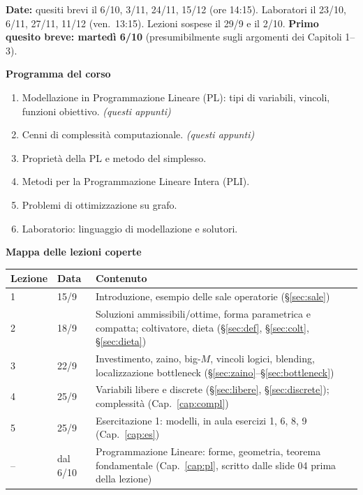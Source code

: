 \textbf{Date:} quesiti brevi il 6/10, 3/11, 24/11, 15/12 (ore 14:15). Laboratori il 23/10, 6/11, 27/11, 11/12 (ven.\ 13:15). Lezioni sospese il 29/9 e il 2/10. \textbf{Primo quesito breve: martedì 6/10} (presumibilmente sugli argomenti dei Capitoli 1--3).

\textbf{Programma del corso}
\begin{enumerate}[nosep]
  \item Modellazione in Programmazione Lineare (PL): tipi di variabili, vincoli, funzioni obiettivo. \hfill \emph{(questi appunti)}
  \item Cenni di complessità computazionale. \hfill \emph{(questi appunti)}
  \item Proprietà della PL e metodo del simplesso.
  \item Metodi per la Programmazione Lineare Intera (PLI).
  \item Problemi di ottimizzazione su grafo.
  \item Laboratorio: linguaggio di modellazione e solutori.
\end{enumerate}

\textbf{Mappa delle lezioni coperte}

\begin{tabular}{@{}llp{}@{}}
\toprule
Lezione & Data & Contenuto \\ \midrule
1 & 15/9 & Introduzione, esempio delle sale operatorie (\S\ref{sec:sale}) \\
2 & 18/9 & Soluzioni ammissibili/ottime, forma parametrica e compatta; coltivatore, dieta (\S\ref{sec:def}, \S\ref{sec:colt}, \S\ref{sec:dieta}) \\
3 & 22/9 & Investimento, zaino, big-$M$, vincoli logici, blending, localizzazione bottleneck (\S\ref{sec:zaino}--\S\ref{sec:bottleneck}) \\
4 & 25/9 & Variabili libere e discrete (\S\ref{sec:libere}, \S\ref{sec:discrete}); complessità (Cap.~\ref{cap:compl}) \\
5 & 25/9 & Esercitazione 1: modelli, in aula esercizi 1, 6, 8, 9 (Cap.~\ref{cap:es}) \\
-- & dal 6/10 & Programmazione Lineare: forme, geometria, teorema fondamentale (Cap.~\ref{cap:pl}, scritto dalle slide 04 prima della lezione) \\
\bottomrule
\end{tabular}

